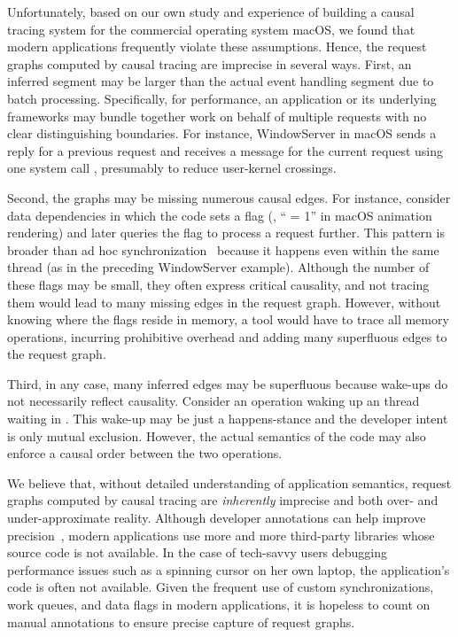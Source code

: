 Unfortunately, based on our own study and experience of building a causal
tracing system for the commercial operating system macOS, we found that modern
applications frequently violate these assumptions. Hence, the request graphs
computed by causal tracing are imprecise in several ways.  First, an inferred
segment may be larger than the actual event handling segment due to batch
processing.  Specifically, for performance, an application or its underlying
frameworks may bundle together work on behalf of multiple requests with no
clear distinguishing boundaries.  For instance, WindowServer in macOS sends a
reply for a previous request and receives a message for the current request
using one system call , presumably to reduce
user-kernel crossings.

Second, the graphs may be missing numerous causal edges.  For instance,
consider data dependencies in which the code sets a flag (\eg,
`` = 1'' in macOS animation rendering) and later queries
the flag to process a request further.  This pattern is broader than ad
hoc synchronization~\cite{xiong2010ad} because it happens even within the
same thread (as in the preceding WindowServer example).  Although the
number of these flags may be small, they often express
critical causality, and not tracing them would lead to many missing edges in
the request graph.  However, without knowing where the flags reside in memory,
a tool would have to trace all memory operations, incurring prohibitive
overhead and adding many superfluous edges to the request graph.

Third, in any case, many inferred edges may be superfluous because wake-ups do
not necessarily reflect causality.  Consider an  operation waking
up an thread waiting in .  This wake-up may be just a happens-stance
and the developer intent is only mutual exclusion.  However, the actual
semantics of the code may also enforce a causal order between the two
operations.

We believe that, without detailed understanding of application semantics,
request graphs computed by causal tracing are \emph{inherently} imprecise and
both over- and under-approximate reality.  Although developer annotations can
help improve precision~\cite{barham2004using, reynolds2006pip}, modern
applications use more and more third-party libraries whose source code is not
available.  In the case of tech-savvy users debugging performance issues such
as a spinning cursor on her own laptop, the application's code is
often not available.  Given the frequent use of custom synchronizations, work
queues, and data flags in modern applications, it is hopeless to count on
manual annotations to ensure precise capture of request graphs.

